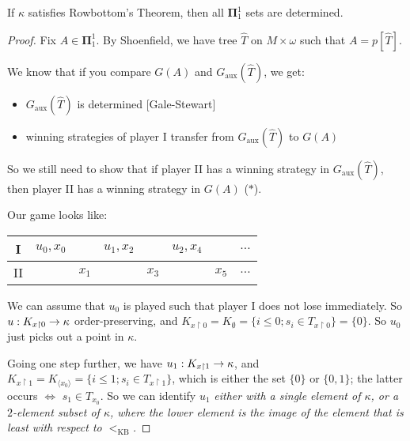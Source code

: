 \documentclass[]{article}
\newcommand{\om}{\omega}
\newcommand{\bopi}{\bm{\Pi}}
\newcommand{\aux}{\textrm{aux}}
\newcommand{\lkb}{<_{\textrm{KB}}}
\begin{document}
\begin{theorem*}[Martin]
    If $\kappa$ satisfies Rowbottom's Theorem, then all $\bopi^1_1$ sets are determined.
\end{theorem*}
\begin{proof}
    Fix $A\in \bopi^1_1$. By Shoenfield, we have tree $\hat{T}$ on $M\times\om$ such that $A = p[\hat{T}]$.

    We know that if you compare $G(A)$ and $G_\aux(\hat{T})$, we get:
    \begin{itemize}
        \item $G_\aux(\hat{T})$ is determined [Gale-Stewart]
        \item winning strategies of player I transfer from $G_\aux(\hat{T})$ to $G(A)$
    \end{itemize}
    So we still need to show that if player II has a winning strategy in $G_\aux(\hat{T})$, then player II has a winning strategy in $G(A)$ ($\ast$).

    Our game looks like:
    \begin{center}
        \begin{tabular}{c|ccccccc}
            I & $u_0,x_0$ & & $u_1,x_2$ & & $u_2,x_4 $& & $\dots $\\ \hline
            II & & $x_1$ & & $x_3 $& &$ x_5$ & $\dots$ 
        \end{tabular}
    \end{center}

    We can assume that $u_0$ is played such that player I does not lose immediately. So $u:K_{x\restriction 0} \rightarrow \kappa$ order-preserving, and $K_{x\restriction 0} = K_\emptyset = \{i\le 0; s_i \in T_{x\restriction 0}\} = \{0\}$. So $u_0$ just picks out a point in $\kappa$.

    Going one step further, we have $u_1 : K_{x\restriction 1} \rightarrow \kappa$, and $K_{x\restriction 1} = K_{\langle x_0 \rangle} = \{i \le 1; s_i \in T_{x\restriction 1}\}$, which is either the set $\{0\}$ or $\{0,1\}$; the latter occurs $\iff$ $s_1 \in T_{x_0}$. So we can identify $u_1$ \it{either} with a single element of $\kappa$, \it{or} a $2$-element subset of $\kappa$, where the lower element is the image of the element that is least with respect to $\lkb$.


\end{proof}
\end{document}
